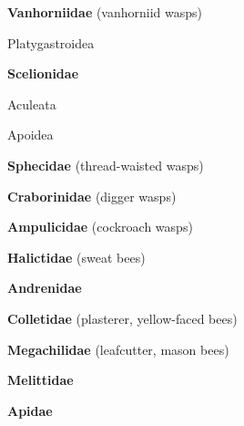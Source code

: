\documentclass[letterpaper,10pt]{article}
\begin{document}
{\makebox[0.6cm]{}  \textbf{Vanhorniidae} (vanhorniid wasps) \par
\makebox[0.4cm]{}  Platygastroidea  \par
\makebox[0.6cm]{}  \textbf{Scelionidae} \par
\makebox[0.2cm]{}  Aculeata \par
\makebox[0.4cm]{}  Apoidea \par
\makebox[0.6cm]{}  \textbf{Sphecidae} (thread-waisted wasps) \par
\makebox[0.6cm]{}  \textbf{Craborinidae} (digger wasps) \par
\makebox[0.6cm]{}  \textbf{Ampulicidae} (cockroach wasps) \par
\makebox[0.6cm]{}  \textbf{Halictidae} (sweat bees) \par
\makebox[0.6cm]{}  \textbf{Andrenidae} \par
\makebox[0.6cm]{}  \textbf{Colletidae} (plasterer, yellow-faced bees) \par
\makebox[0.6cm]{}  \textbf{Megachilidae} (leafcutter, mason bees) \par
\makebox[0.6cm]{}  \textbf{Melittidae} \par
\makebox[0.6cm]{}  \textbf{Apidae} \par
}
\end{document}
